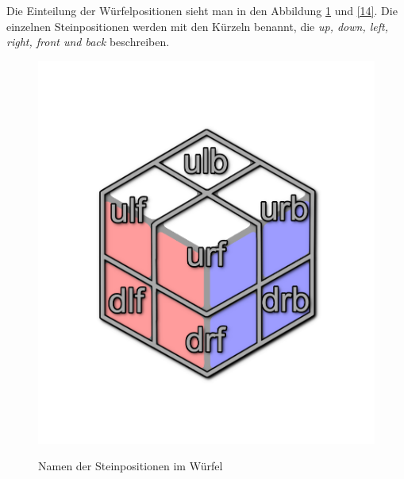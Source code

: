 \documentclass[12pt,a4paper, usenames, dvipsnames]{article}
\begin{document}
Die Einteilung der Würfelpositionen sieht man in den Abbildung \ref{13} und \ref{14}. Die einzelnen Steinpositionen werden mit den Kürzeln benannt, die \textit{up, down, left, right, front und back} beschreiben.
\begin{figure}[h]
\centering
\includegraphics[scale=0.15]{caged_positions.png} \\
\caption[Namen der Steinpositionen im Würfel]{Namen der Steinpositionen im Würfel}
\label{13}
\end{figure}
\end{document}
